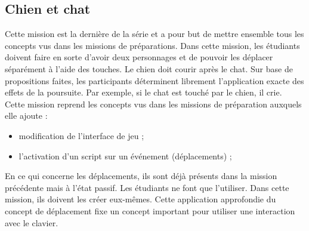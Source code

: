 \subsection{Chien et chat}
\label{chien-chat}
Cette mission est la dernière de la série et a pour but de mettre ensemble tous les concepts vus dans les missions de préparations. Dans cette mission, les étudiants doivent faire en sorte d'avoir deux personnages et de pouvoir les déplacer séparément à l'aide des touches. Le chien doit courir après le chat. Sur base de propositions faites, les participants déterminent librement l'application exacte des effets de la poursuite. Par exemple, si le chat est touché par le chien, il crie.\\

Cette mission reprend les concepts vus dans les missions de préparation auxquels elle ajoute :
\begin{itemize}
\item modification de l'interface de jeu ;
\item l'activation d'un script sur un événement (déplacements) ;
\end{itemize}

En ce qui concerne les déplacements, ils sont déjà présents dans la mission précédente mais à l'état passif. Les étudiants ne font que l'utiliser. Dans cette mission, ils doivent les créer eux-mêmes. Cette application approfondie du concept de déplacement fixe un concept important pour utiliser une interaction avec le clavier.

